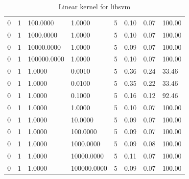 \documentclass[12pt,oneside]{book}
\begin{document}
\begin{table}
\begin{tabular}{|l|l|l|l|l|l|l|l|}
0               & 1               & 100.0000        & 1.0000          & 5               & 0.10            & 0.07            & 100.00          \\
0               & 1               & 1000.0000       & 1.0000          & 5               & 0.10            & 0.07            & 100.00          \\
0               & 1               & 10000.0000      & 1.0000          & 5               & 0.09            & 0.07            & 100.00          \\
0               & 1               & 100000.0000     & 1.0000          & 5               & 0.10            & 0.07            & 100.00          \\
0               & 1               & 1.0000          & 0.0010          & 5               & 0.36            & 0.24            & 33.46           \\
0               & 1               & 1.0000          & 0.0100          & 5               & 0.35            & 0.22            & 33.46           \\
0               & 1               & 1.0000          & 0.1000          & 5               & 0.16            & 0.12            & 92.46           \\
0               & 1               & 1.0000          & 1.0000          & 5               & 0.10            & 0.07            & 100.00          \\
0               & 1               & 1.0000          & 10.0000         & 5               & 0.09            & 0.07            & 100.00          \\
0               & 1               & 1.0000          & 100.0000        & 5               & 0.09            & 0.07            & 100.00          \\
0               & 1               & 1.0000          & 1000.0000       & 5               & 0.09            & 0.08            & 100.00          \\
0               & 1               & 1.0000          & 10000.0000      & 5               & 0.11            & 0.07            & 100.00          \\
0               & 1               & 1.0000          & 100000.0000     & 5               & 0.09            & 0.07            & 100.00          \\

\hline
\end{tabular}
\caption{Linear kernel for libsvm}
\label{table:obv-6-libsvm-linear}
\end{table}
\end{document}
